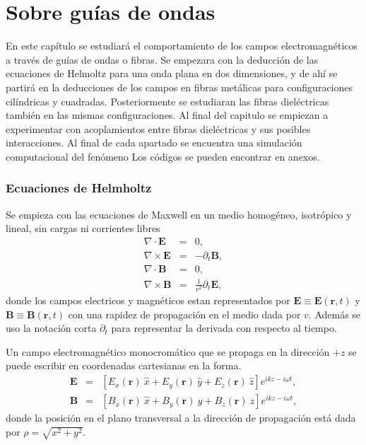 \chapter{Sobre guías de ondas}
En este capítulo se estudiará el comportamiento de los campos electromagnéticos a través de guías de ondas o fibras. Se empezara con la deducción de las ecuaciones de Helmoltz para una onda plana en dos dimensiones, y de ahí se partirá en la deducciones de los campos en fibras metálicas para configuraciones cilíndricas y cuadradas. Posteriormente se estudiaran las fibras dieléctricas también en las mismas configuraciones. Al final del capitulo se empiezan a experimentar con acoplamientos entre fibras dieléctricas y sus posibles interacciones. Al final de cada apartado se encuentra una simulación computacional del fenómeno Los códigos se pueden encontrar en anexos.
\subsection{Ecuaciones de Helmholtz}

Se empieza con las ecuaciones de Maxwell en un medio homogéneo, isotrópico y lineal, sin cargas ni corrientes libres \cite{Stratton1941}
\begin{subequations}\label{Maxwell}
	\begin{eqnarray}
	\nabla \cdot \mathbf{E} &=& 0,\label{Primera}\\
	\nabla \times \mathbf{E} &=& - \partial_{t} \mathbf{B},\label{segunda}\\
	\nabla \cdot \mathbf{B} &=& 0,\label{tercera}\\
	\nabla \times \mathbf{B} &=&  \frac{1}{v^2} \partial_{t} \mathbf{E},\label{cuarta}
	\end{eqnarray}
\end{subequations}
donde los campos electricos y magnéticos estan representados por $\mathbf{E} \equiv \mathbf{E}(\mathbf{r},t)$ y $\mathbf{B} \equiv \mathbf{B}(\mathbf{r},t)$ con una rapidez de propagación en el medio dada por $v$. Además se uso la notación corta $\partial_{t}$ para representar la derivada con respecto al tiempo.


Un campo electromagnético monocromático que se propaga en la dirección $+z$ se puede escribir en coordenadas cartesianas en la forma.
\begin{subequations}\label{Camposincidentes}
	\begin{eqnarray}
	\mathbf{E} &=& \left[E_{x}(\mathbf{r}) ~ \hat{x} + E_{y}(\mathbf{r})~ \hat{y} + E_{z}(\mathbf{r})~ \hat{z} \right] e^{ i k z - i \omega t }, \\
	\mathbf{B} &=& \left[B_{x}(\mathbf{r})~ \hat{x} + B_{y}(\mathbf{r})~ \hat{y} + B_{z}(\mathbf{r})~ \hat{z} \right] e^{i k z - i  \omega t},
	\end{eqnarray}
\end{subequations}
donde la posición en el plano transversal a la dirección de propagación está dada por $\rho = \sqrt{x^2 + y^2}$.

